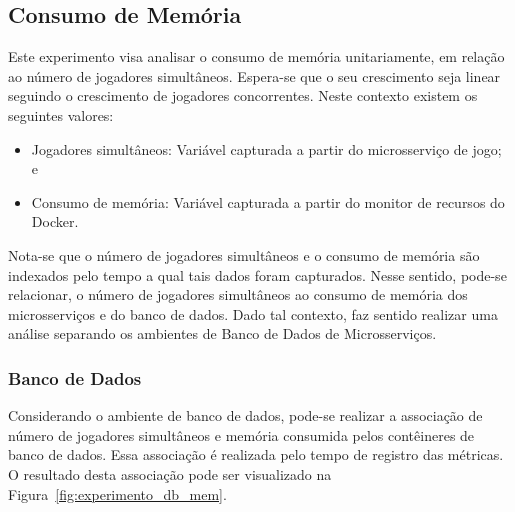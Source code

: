 \subsection{Consumo de Memória}



Este experimento visa analisar o consumo de memória unitariamente, em relação ao número de jogadores simultâneos.
%
Espera-se que o seu crescimento seja linear seguindo o crescimento de jogadores concorrentes.
%
Neste contexto existem os seguintes valores:



\begin{itemize}
    \item Jogadores simultâneos: Variável capturada a partir do microsserviço de jogo; e
    \item Consumo de memória: Variável capturada a partir do monitor de recursos do Docker.
\end{itemize}

Nota-se que o número de jogadores simultâneos e o consumo de memória são indexados pelo tempo a qual tais dados foram capturados.
%
Nesse sentido, pode-se relacionar, o número de jogadores simultâneos ao consumo de memória dos microsserviços e do banco de dados.
%
Dado tal contexto, faz sentido realizar uma análise separando os ambientes de Banco de Dados de Microsserviços.

\subsubsection{Banco de Dados}



Considerando o ambiente de banco de dados, pode-se realizar a associação de número de jogadores simultâneos e memória consumida pelos contêineres de banco de dados.
%
Essa associação é realizada pelo tempo de registro das métricas.
%
O resultado desta associação pode ser visualizado na Figura~\ref{fig:experimento_db_mem}.



